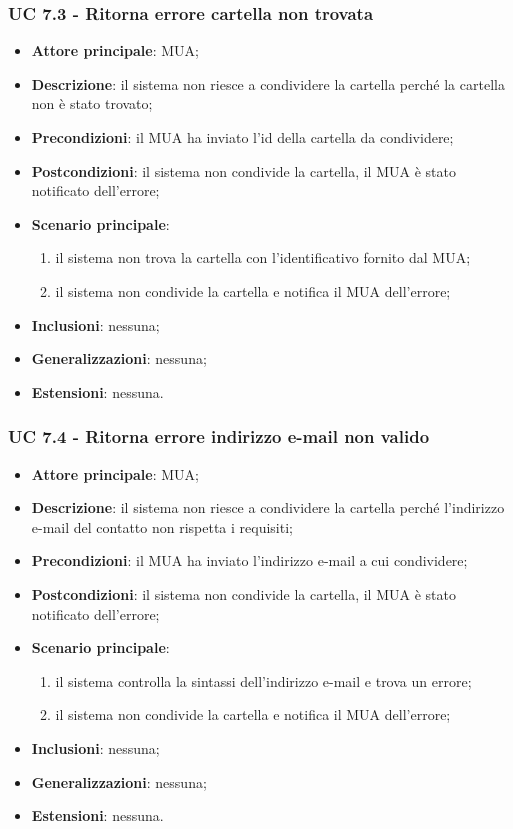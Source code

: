 \subsubsection{UC 7.3 - Ritorna errore cartella non trovata} \label{sec:UC7.3}
    \begin{itemize}
        \item \textbf{Attore principale}: MUA;
        \item \textbf{Descrizione}: il sistema non riesce a condividere la cartella perché la cartella non è stato trovato;
        \item \textbf{Precondizioni}: il MUA ha inviato l'id della cartella da condividere;
        \item \textbf{Postcondizioni}: il sistema non condivide la cartella, il MUA è stato notificato dell'errore;
        \item \textbf{Scenario principale}:
            \begin{enumerate}
                \item il sistema non trova la cartella con l'identificativo fornito dal MUA;
                \item il sistema non condivide la cartella e notifica il MUA dell'errore;
            \end{enumerate}
        \item \textbf{Inclusioni}: nessuna;
        \item \textbf{Generalizzazioni}: nessuna;
        \item \textbf{Estensioni}: nessuna.
    \end{itemize}

    \subsubsection{UC 7.4 - Ritorna errore indirizzo e-mail non valido} \label{sec:UC7.4}
    \begin{itemize}
        \item \textbf{Attore principale}: MUA;
        \item \textbf{Descrizione}: il sistema non riesce a condividere la cartella perché l'indirizzo e-mail del contatto non rispetta i requisiti;
        \item \textbf{Precondizioni}: il MUA ha inviato l'indirizzo e-mail a cui condividere;
        \item \textbf{Postcondizioni}: il sistema non condivide la cartella, il MUA è stato notificato dell'errore;
        \item \textbf{Scenario principale}:
            \begin{enumerate}
                \item il sistema controlla la sintassi dell'indirizzo e-mail e trova un errore;
                \item il sistema non condivide la cartella e notifica il MUA dell'errore;
            \end{enumerate}
        \item \textbf{Inclusioni}: nessuna;
        \item \textbf{Generalizzazioni}: nessuna;
        \item \textbf{Estensioni}: nessuna.
    \end{itemize}
